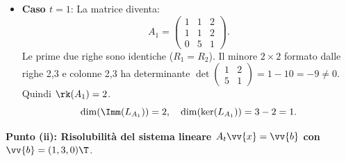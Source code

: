 \begin{dimostrazione}
\begin{itemize}
    \item \textbf{Caso $t = 1$}: La matrice diventa:
    \begin{equation}
        A_1 = \begin{pmatrix} 1 & 1 & 2 \\ 1 & 1 & 2 \\ 0 & 5 & 1 \end{pmatrix}.
    \end{equation}
    Le prime due righe sono identiche ($R_1 = R_2$). Il minore $2 \times 2$ formato dalle righe 2,3 e colonne 2,3 ha determinante $\det \begin{pmatrix} 1 & 2 \\ 5 & 1 \end{pmatrix} = 1 - 10 = -9 \neq 0$.
    Quindi $\rk(A_1) = 2$.
    \begin{equation}
        \dim(\Imm(L_{A_1})) = 2, \quad \dim(\ker(L_{A_1})) = 3 - 2 = 1.
    \end{equation}
\end{itemize}

\textbf{Punto (ii): Risolubilità del sistema lineare $A_t \vv{x} = \vv{b}$ con $\vv{b} = (1, 3, 0)\T$}.


\end{dimostrazione}
